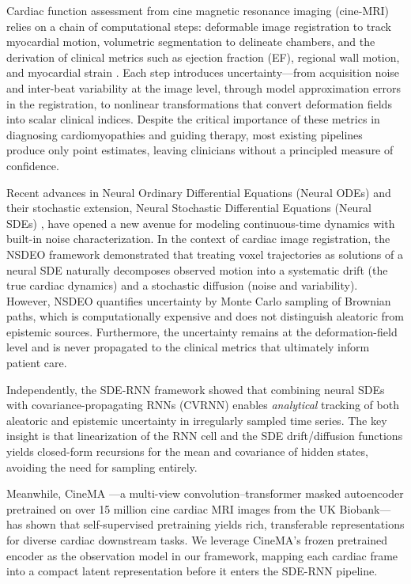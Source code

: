 \documentclass[10pt,twocolumn]{article}
\begin{document}
Cardiac function assessment from cine magnetic resonance imaging (cine-MRI) relies on a chain of computational steps: deformable image registration to track myocardial motion, volumetric segmentation to delineate chambers, and the derivation of clinical metrics such as ejection fraction (EF), regional wall motion, and myocardial strain \cite{qin2018joint}. Each step introduces uncertainty---from acquisition noise and inter-beat variability at the image level, through model approximation errors in the registration, to nonlinear transformations that convert deformation fields into scalar clinical indices. Despite the critical importance of these metrics in diagnosing cardiomyopathies and guiding therapy, most existing pipelines produce only point estimates, leaving clinicians without a principled measure of confidence.

Recent advances in Neural Ordinary Differential Equations (Neural ODEs) \cite{chen2018neural} and their stochastic extension, Neural Stochastic Differential Equations (Neural SDEs) \cite{li2020scalable,tzen2019neural}, have opened a new avenue for modeling continuous-time dynamics with built-in noise characterization. In the context of cardiac image registration, the NSDEO framework \cite{wu2022nodeo} demonstrated that treating voxel trajectories as solutions of a neural SDE naturally decomposes observed motion into a systematic drift (the true cardiac dynamics) and a stochastic diffusion (noise and variability). However, NSDEO quantifies uncertainty by Monte Carlo sampling of Brownian paths, which is computationally expensive and does not distinguish aleatoric from epistemic sources. Furthermore, the uncertainty remains at the deformation-field level and is never propagated to the clinical metrics that ultimately inform patient care.

Independently, the SDE-RNN framework \cite{dahale2023general} showed that combining neural SDEs with covariance-propagating RNNs (CVRNN) enables \emph{analytical} tracking of both aleatoric and epistemic uncertainty in irregularly sampled time series. The key insight is that linearization of the RNN cell and the SDE drift/diffusion functions yields closed-form recursions for the mean and covariance of hidden states, avoiding the need for sampling entirely.

Meanwhile, CineMA \cite{fu2025cinema}---a multi-view convolution--transformer masked autoencoder pretrained on over 15 million cine cardiac MRI images from the UK Biobank---has shown that self-supervised pretraining yields rich, transferable representations for diverse cardiac downstream tasks. We leverage CineMA's frozen pretrained encoder as the observation model in our framework, mapping each cardiac frame into a compact latent representation before it enters the SDE-RNN pipeline.
\end{document}
